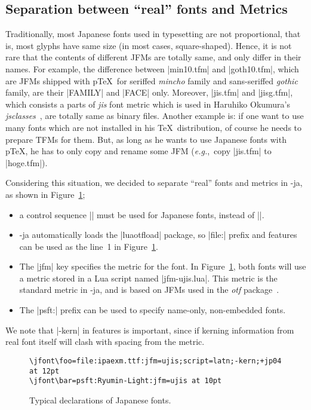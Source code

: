 \documentclass{ajt}
\begin{document}
\subsection{Separation between ``real'' fonts and Metrics}
\label{ssec-sepmet}

Traditionally, most Japanese fonts used in typesetting are not proportional,
that is, most glyphs have same size (in most cases,
square-shaped). Hence, it is not rare that the contents of different
JFMs are totally same, and only differ in their names. For example, the
difference between |min10.tfm| and |goth10.tfm|, which are JFMs shipped
with p\TeX\ for seriffed \emph{mincho} family and sans-seriffed
\emph{gothic} family, are their |FAMILY| and |FACE| only. Moreover,
|jis.tfm| and |jisg.tfm|, which consists a parts of \emph{jis} font
metric which is used in Haruhiko Okumura's
\emph{jsclasses}~\cite{jsclasses}, are totally same as binary files.
Another example is: if one want to use many fonts which are not
installed in his \TeX\ distribution, of course he needs to prepare TFMs
for them. But, as long as he wants to use Japanese fonts with p\TeX, he
has to only copy and rename some JFM (\emph{e.g.},~copy |jis.tfm| to
|hoge.tfm|).

Considering this situation, we decided to separate ``real'' fonts and
metrics in \LuaTeX-ja, as shown in Figure~\ref{fig-jfdef};
\begin{itemize}
\item a control sequence |\jfont| must be used for Japanese fonts, instead of |\font|.
\item \LuaTeX-ja automatically loads the |luaotfload| package, so
      |file:| prefix and features can be used as the line~1 in
      Figure~\ref{fig-jfdef}.
\item The |jfm| key specifies the metric for the font. In
      Figure~\ref{fig-jfdef}, both fonts will use a metric stored in a
      Lua script named |jfm-ujis.lua|. This metric is the standard
      metric in \LuaTeX-ja, and is based on JFMs used in the \emph{otf}
      package~\cite{otf}.
\item The |psft:| prefix can be used to specify name-only, non-embedded
      fonts. 
\end{itemize}
We note that |-kern| in features is important, since if kerning
information from real font itself will clash with spacing from the
metric.

\begin{figure}
\begin{verbatim}
\jfont\foo=file:ipaexm.ttf:jfm=ujis;script=latn;-kern;+jp04 at 12pt
\jfont\bar=psft:Ryumin-Light:jfm=ujis at 10pt
\end{verbatim}
\caption{Typical declarations of Japanese fonts.}
\label{fig-jfdef}
\end{figure}
\end{document}

